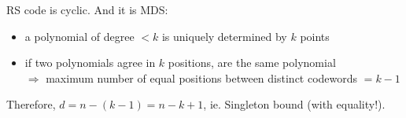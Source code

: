 \documentclass{article}
\theoremstyle{definition}
\begin{document}
RS code is cyclic. And it is MDS:
\begin{itemize}
  \item a polynomial of degree $<k$ is uniquely determined by $k$ points
  \item if two polynomials agree in $k$ positions, are the same polynomial\\
    $\Longrightarrow$ maximum number of equal positions between distinct codewords $= k-1$
\end{itemize}

Therefore, $d=n-(k-1) = n-k+1$, ie. Singleton bound (with equality!).






\end{document}
